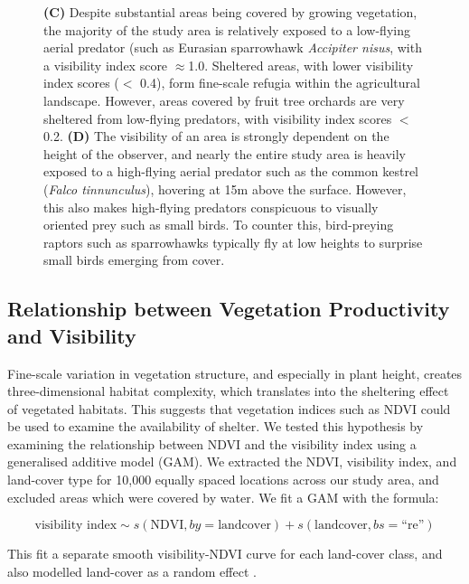 \begin{figure}
{        \textbf{(C)} Despite substantial areas being covered by growing vegetation, the majority of the study area is relatively exposed to a low-flying aerial predator (such as Eurasian sparrowhawk \textit{Accipiter nisus}, with a visibility index score $\approx$1.0. Sheltered areas, with lower visibility index scores ($<$ 0.4), form fine-scale refugia within the agricultural landscape.
        However, areas covered by fruit tree orchards are very sheltered from low-flying predators, with visibility index scores $<$ 0.2.
        \textbf{(D)} The visibility of an area is strongly dependent on the height of the observer, and nearly the entire study area is heavily exposed to a high-flying aerial predator such as the common kestrel (\textit{Falco tinnunculus}), hovering at 15m above the surface.
        However, this also makes high-flying predators conspicuous to visually oriented prey such as small birds.
        To counter this, bird-preying raptors such as sparrowhawks typically fly at low heights to surprise small birds emerging from cover.
    }
    \label{fig:hula-maps}
\end{figure}

\subsection*{Relationship between Vegetation Productivity and Visibility}

Fine-scale variation in vegetation structure, and especially in plant height, creates three-dimensional habitat complexity, which translates into the sheltering effect of vegetated habitats.
This suggests that vegetation indices such as NDVI could be used to examine the availability of shelter.
We tested this hypothesis by examining the relationship between NDVI and the visibility index using a generalised additive model (GAM).
We extracted the NDVI, visibility index, and land-cover type for 10,000 equally spaced locations across our study area, and excluded areas which were covered by water.
We fit a GAM with the formula: 
\begin{linenomath*}
    $$\text{visibility~index} \sim s(\text{NDVI}, by = \text{landcover}) + s(\text{landcover}, bs = \text{``re''})$$
\end{linenomath*}
This fit a separate smooth visibility-NDVI curve for each land-cover class, and also modelled land-cover as a random effect \parencite{wood2017}.

